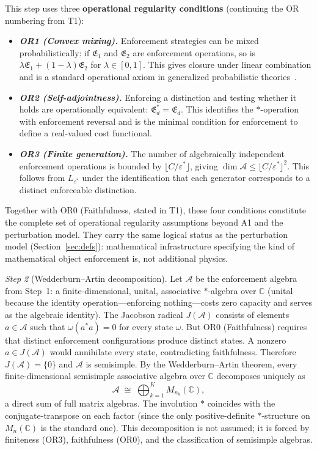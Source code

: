 \documentclass[11pt]{article}
\newenvironment{varlist}{\begin{itemize}[nosep,leftmargin=2em]}{\end{itemize}}
\begin{document}
\begin{tcolorbox}[apfbox, title={T2: Noncommutativity $\to$ Operator Algebra on Hilbert Space}]
This step uses three \textbf{operational regularity conditions} (continuing the OR numbering from T1):
\begin{varlist}
\item \textbf{\textit{OR1 (Convex mixing).}}  Enforcement strategies can be mixed probabilistically: if $\mathfrak{E}_1$ and $\mathfrak{E}_2$ are enforcement operations, so is $\lambda\mathfrak{E}_1 + (1-\lambda)\mathfrak{E}_2$ for $\lambda \in [0,1]$.  This gives closure under linear combination and is a standard operational axiom in generalized probabilistic theories~\cite{Hardy2001,CDP2011}.
\item \textbf{\textit{OR2 (Self-adjointness).}}  Enforcing a distinction and testing whether it holds are operationally equivalent: $\mathfrak{E}_d^* = \mathfrak{E}_d$.  This identifies the $*$-operation with enforcement reversal and is the minimal condition for enforcement to define a real-valued cost functional.
\item \textbf{\textit{OR3 (Finite generation).}}  The number of algebraically independent enforcement operations is bounded by $\lfloor C/\varepsilon^* \rfloor$, giving $\dim \mathcal{A} \le \lfloor C/\varepsilon^* \rfloor^2$.  This follows from $L_{\varepsilon^*}$ under the identification that each generator corresponds to a distinct enforceable distinction.
\end{varlist}
Together with OR0 (Faithfulness, stated in T1), these four conditions constitute the complete set of operational regularity assumptions beyond A1 and the perturbation model.  They carry the same logical status as the perturbation model (Section~\ref{sec:defs}): mathematical infrastructure specifying the kind of mathematical object enforcement is, not additional physics.

\textit{Step 2} (Wedderburn--Artin decomposition).  Let $\mathcal{A}$ be the enforcement algebra from Step~1: a finite-dimensional, unital, associative $*$-algebra over $\mathbb{C}$ (unital because the identity operation---enforcing nothing---costs zero capacity and serves as the algebraic identity).  The Jacobson radical $J(\mathcal{A})$ consists of elements $a \in \mathcal{A}$ such that $\omega(a^* a) = 0$ for every state $\omega$.  But OR0 (Faithfulness) requires that distinct enforcement configurations produce distinct states.  A nonzero $a \in J(\mathcal{A})$ would annihilate every state, contradicting faithfulness.  Therefore $J(\mathcal{A}) = \{0\}$ and $\mathcal{A}$ is semisimple.  By the Wedderburn--Artin theorem, every finite-dimensional semisimple associative algebra over $\mathbb{C}$ decomposes uniquely as
\begin{equation}
\mathcal{A} \;\cong\; \bigoplus_{k=1}^K M_{n_k}(\mathbb{C}),
\end{equation}
a direct sum of full matrix algebras.  The involution $*$ coincides with the conjugate-transpose on each factor (since the only positive-definite $*$-structure on $M_n(\mathbb{C})$ is the standard one).  This decomposition is not assumed; it is forced by finiteness (OR3), faithfulness (OR0), and the classification of semisimple algebras.


\end{tcolorbox}
\end{document}
